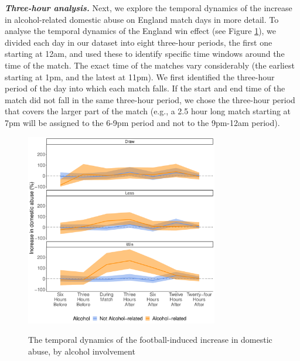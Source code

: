 \documentclass[12pt, a4paper]{article}
\begin{document}
\textbf{\textit{Three-hour analysis.}} Next, we explore the temporal dynamics of the increase in alcohol-related domestic abuse on England match days in more detail. To analyse the temporal dynamics of the England win effect (see Figure \ref{fig:threehours}), we divided each day in our dataset into eight three-hour periods, the first one starting at 12am, and used these to identify specific time windows around the time of the match. The exact time of the matches vary considerably (the earliest starting at 1pm, and the latest at 11pm). We first identified the three-hour period of the day into which each match falls. If the start and end time of the match did not fall in the same three-hour period, we chose the three-hour period that covers the larger part of the match (e.g., a 2.5 hour long match starting at 7pm will be assigned to the 6-9pm period and not to the 9pm-12am period).


 \begin{figure}[htb]
\centering
 \caption{The temporal dynamics of the football-induced increase in domestic abuse, by alcohol involvement}
\includegraphics[width=0.75\textwidth]{Threehours.pdf}
\label{fig:threehours}
\end{figure}
\end{document}
